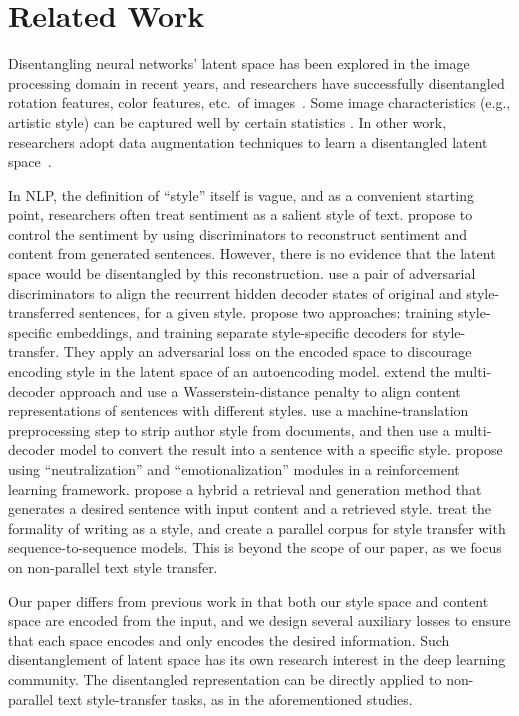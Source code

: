 \documentclass[11pt,a4paper]{article}
\begin{document}
\section{Related Work}

Disentangling neural networks' latent space has been explored in the image processing domain in recent years, and researchers have successfully disentangled rotation features, color features, etc.~of images~\cite{chen2016infogan,luan2017deep}.
Some image characteristics (e.g., artistic style) can be captured well by certain statistics \cite{gatys2016image}.
In other work, researchers adopt data augmentation techniques to learn a disentangled latent space~\cite{kulkarni2015deep,champandard2016semantic}.

In NLP, the definition of ``style'' itself is vague, and as a convenient starting point, researchers often treat sentiment as a salient style of text.
\citet{hu2017toward} propose to control the sentiment by using discriminators to reconstruct sentiment and content from generated sentences.
However, there is no evidence that the latent space would be disentangled by this reconstruction.
\citet{shen2017style} use a pair of adversarial discriminators to align the recurrent hidden decoder states of original and style-transferred sentences, for a given style.
\citet{fu2018style} propose two approaches: training style-specific embeddings, and training separate style-specific decoders for style-transfer. They apply an adversarial loss on the encoded space to discourage encoding style in the latent space of an autoencoding model. \citet{zhao2018adversarially} extend the multi-decoder approach and use a Wasserstein-distance penalty to align content representations of sentences with different styles.
\citet{prabhumoye2018style} use a machine-translation preprocessing step to strip author style from documents, and then use a multi-decoder model to convert the result into a sentence with a specific style.
\citet{xu2018unpaired} propose using ``neutralization'' and ``emotionalization'' modules in a reinforcement learning framework.
\citet{li2018delete} propose a hybrid a retrieval and generation method that generates a desired sentence with input content and a retrieved style.
\citet{rao2018dear} treat the formality of writing as a style, and create a parallel corpus for style transfer with sequence-to-sequence models. This is beyond the scope of our paper, as we focus on non-parallel text style transfer.

Our paper differs from previous work in that both our style space and content space are encoded from the input, and we design several auxiliary losses to ensure that each space encodes and only encodes the desired information.
Such disentanglement of latent space has its own research interest in the deep learning community.
The disentangled representation can be directly applied to non-parallel text style-transfer tasks, as in the aforementioned studies.
\end{document}
